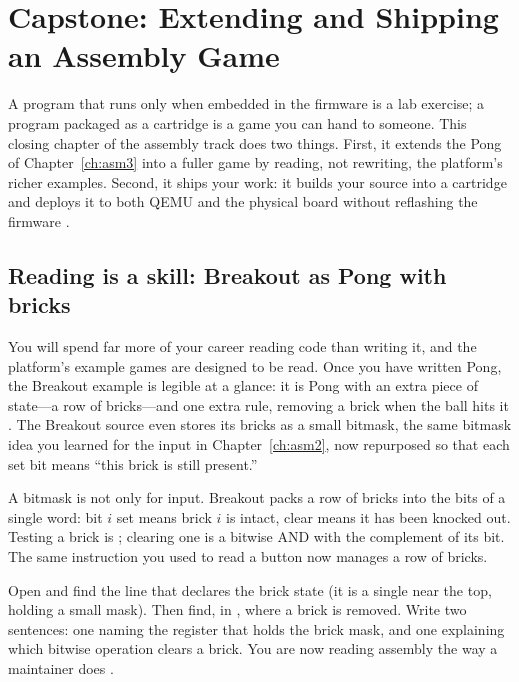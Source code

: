 \chapter{Capstone: Extending and Shipping an Assembly Game}
\label{ch:asmcap}

A program that runs only when embedded in the firmware is a lab exercise; a
program packaged as a cartridge is a game you can hand to someone. This closing
chapter of the assembly track does two things. First, it extends the Pong of
Chapter~\ref{ch:asm3} into a fuller game by reading, not rewriting, the
platform's richer examples. Second, it ships your work: it builds your source
into a  cartridge and deploys it to both QEMU and the physical
board without reflashing the firmware \citep{prg32tutorial,prg32cartfmt}.

\section{Reading is a skill: Breakout as Pong with bricks}

You will spend far more of your career reading code than writing it, and the
platform's example games are designed to be read. Once you have written Pong, the
Breakout example is legible at a glance: it is Pong with an extra piece of
state---a row of bricks---and one extra rule, removing a brick when the ball hits
it \citep{prg32repo}. The Breakout source even stores its bricks as a small bitmask,
the same bitmask idea you learned for the input in Chapter~\ref{ch:asm2}, now
repurposed so that each set bit means ``this brick is still present.''

\begin{prgconcept}
A bitmask is not only for input. Breakout packs a row of bricks into the bits of a
single word: bit $i$ set means brick $i$ is intact, clear means it has been
knocked out. Testing a brick is ; clearing one is a bitwise AND with
the complement of its bit. The same instruction you used to read a button now
manages a row of bricks.
\end{prgconcept}

\begin{prgtry}
Open  and find the line that
declares the brick state (it is a single  near the top, holding a
small mask). Then find, in , where a brick is removed. Write two
sentences: one naming the register that holds the brick mask, and one explaining
which bitwise operation clears a brick. You are now reading assembly the way a
maintainer does \citep{prg32repo}.
\end{prgtry}

